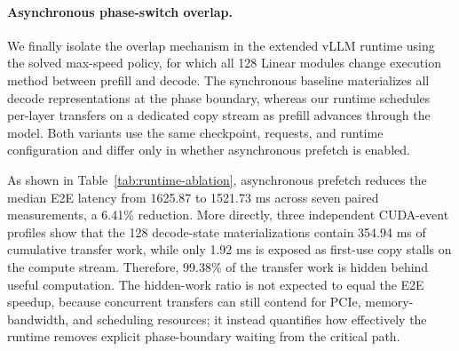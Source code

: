 \paragraph{Asynchronous phase-switch overlap.}
We finally isolate the overlap mechanism in the extended vLLM runtime using
the solved max-speed policy, for which all 128 Linear modules change execution
method between prefill and decode. The synchronous baseline materializes all
decode representations at the phase boundary, whereas our runtime schedules
per-layer transfers on a dedicated copy stream as prefill advances through
the model. Both variants use the same checkpoint, requests, and runtime
configuration and differ only in whether asynchronous prefetch is enabled.

As shown in Table~\ref{tab:runtime-ablation}, asynchronous prefetch reduces the
median E2E latency from 1625.87 to 1521.73 ms across seven paired measurements,
a 6.41\% reduction. More directly, three independent CUDA-event profiles show
that the 128 decode-state materializations contain 354.94 ms of cumulative
transfer work, while only 1.92 ms is exposed as first-use copy stalls on the
compute stream. Therefore, 99.38\% of the transfer work is hidden behind useful
computation. The hidden-work ratio is not expected to equal the E2E speedup,
because concurrent transfers can still contend for PCIe, memory-bandwidth, and
scheduling resources; it instead quantifies how effectively the runtime removes
explicit phase-boundary waiting from the critical path.

\begin{table}[t]
\centering
\small
\caption{Runtime ablation and direct overlap profile on Llama3.1-8B-Instruct.}
\setlength{\tabcolsep}{4pt}
\label{tab:runtime-ablation}
\end{table}
